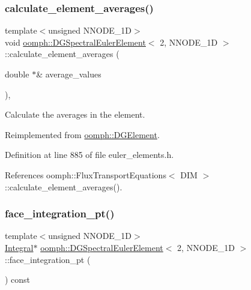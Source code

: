 \subsubsection{\texorpdfstring{calculate\+\_\+element\+\_\+averages()}{calculate\_element\_averages()}}
{\footnotesize\ttfamily template$<$unsigned N\+N\+O\+D\+E\+\_\+1D$>$ \\
void \hyperlink{classoomph_1_1DGSpectralEulerElement}{oomph\+::\+D\+G\+Spectral\+Euler\+Element}$<$ 2, N\+N\+O\+D\+E\+\_\+1D $>$\+::calculate\+\_\+element\+\_\+averages (\begin{DoxyParamCaption}\item[{double $\ast$\&}]{average\+\_\+values }\end{DoxyParamCaption})\hspace{0.3cm}{\ttfamily [inline]}, {\ttfamily [virtual]}}



Calculate the averages in the element. 



Reimplemented from \hyperlink{classoomph_1_1DGElement_a336c61ef405a4710060f177e707c3ec9}{oomph\+::\+D\+G\+Element}.



Definition at line 885 of file euler\+\_\+elements.\+h.



References oomph\+::\+Flux\+Transport\+Equations$<$ D\+I\+M $>$\+::calculate\+\_\+element\+\_\+averages().

\mbox{\label{classoomph_1_1DGSpectralEulerElement_3_012_00_01NNODE__1D_01_4_abcd6b0ac3212b7079b02f01774a533b0}} 
\subsubsection{\texorpdfstring{face\+\_\+integration\+\_\+pt()}{face\_integration\_pt()}}
{\footnotesize\ttfamily template$<$unsigned N\+N\+O\+D\+E\+\_\+1D$>$ \\
\hyperlink{classoomph_1_1Integral}{Integral}$\ast$ \hyperlink{classoomph_1_1DGSpectralEulerElement}{oomph\+::\+D\+G\+Spectral\+Euler\+Element}$<$ 2, N\+N\+O\+D\+E\+\_\+1D $>$\+::face\+\_\+integration\+\_\+pt (\begin{DoxyParamCaption}{ }\end{DoxyParamCaption}) const\hspace{0.3cm}{\ttfamily [inline]}}



